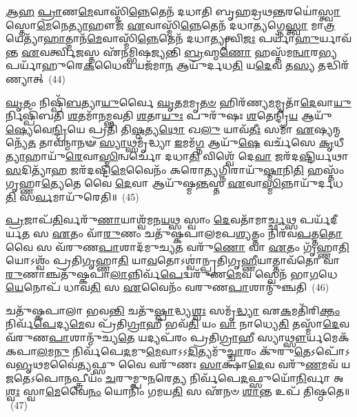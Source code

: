 \-\ul{𑌆}\-\-\ul{𑌹} \ul{𑌪𑍍𑌰𑌾}\-𑌣\-\ul{𑌮𑍇}\-𑌵𑌾𑌸𑍍𑌮𑌿᳴\-\ul{𑌨𑍍𑌨𑍇}\-𑌤𑍇𑌨᳴ 𑌦𑌧𑌾𑌤𑌿 𑌬𑍃𑌹𑌦𑍍𑌰𑌥\-\ul{𑌨𑍍𑌤}\-𑌰𑌯𑍋॑\-\ul{𑌸𑍍𑌤𑍍𑌵𑌾} 𑌸𑍍𑌤𑍋\-\ul{𑌮𑍇}\-𑌨𑍇\-\ul{𑌤𑍍𑌯𑌾}\-𑌹𑍗𑌜᳴ \ul{𑌏}\-𑌵𑌾𑌸𑍍𑌮𑌿᳴\-\ul{𑌨𑍍𑌨𑍇}\-𑌤𑍇𑌨᳴ 𑌦𑌧𑌾\-\ul{𑌤𑍍𑌯}\-𑌗𑍍𑌨𑍇\-\ul{𑌸𑍍𑌤𑍍𑌵𑌾} 𑌮𑌾\-\ul{𑌤𑍍𑌰}\-𑌯𑍇𑌤𑍍𑌯𑌾᳴\-\ul{𑌹𑌾}\-𑌤𑍍𑌮𑌾𑌨᳴\-\ul{𑌮𑍇}\-𑌵𑌾𑌸𑍍𑌮𑌿᳴\-\ul{𑌨𑍍𑌨𑍇}\-𑌤𑍇𑌨᳴ 𑌦𑌧𑌾\-\ul{𑌤𑍍𑌯𑍃}\-𑌤𑍍𑌵𑌿\-\ul{𑌜𑌃} 𑌪𑌰𑍍𑌯𑌾᳴\-\ul{𑌹𑍁}\-𑌰𑍍𑌯𑌾𑌵᳴𑌨𑍍𑌤 \ul{𑌏}\-𑌵𑌰𑍍𑌤𑍍𑌵𑌿\-\ul{𑌜}\-𑌸𑍍𑌤 𑌏᳴𑌨𑌮𑍍𑌭𑌿𑌷𑌜𑍍𑌯𑌨𑍍𑌤𑌿 \ul{𑌬𑍍𑌰}\-𑌹𑍍𑌮\-\ul{𑌣𑍋} 𑌹𑌸𑍍𑌤᳴𑌮\-\ul{𑌨𑍍𑌵𑌾}\-𑌰\-\ul{𑌭𑍍𑌯} 𑌪𑌰𑍍𑌯𑌾᳴𑌹𑍁𑌰𑍇\-\ul{𑌕}\-𑌧𑍈𑌵 𑌯𑌜᳴𑌮𑌾\-\ul{𑌨} 𑌆𑌯𑍁᳴𑌰𑍍𑌦𑌧\-\ul{𑌤𑌿} 𑌯\-\ul{𑌦𑍇}\-𑌵 𑌤\-\ul{𑌸𑍍𑌯} 𑌤𑌦𑍍𑌧𑌿𑌰᳴𑌣𑍍𑌯𑌾𑌤𑍍~(44)

\-\ul{𑌘𑍃}\-𑌤𑌂 𑌨𑌿𑌷𑍍𑌪𑌿᳴\-\ul{𑌬}\-𑌤𑍍𑌯𑌾\-\ul{𑌯𑍁}\-𑌰𑍍𑌵𑍈 \ul{𑌘𑍃}\-𑌤\-\ul{𑌮}\-𑌮𑍃\-\ul{𑌤}\-\-\ul{𑍞} 𑌹𑌿𑌰᳴𑌣𑍍𑌯\-\ul{𑌮}\-𑌮𑍃𑌤𑌾᳴\-\ul{𑌦𑍇}\-𑌵𑌾\-\ul{𑌯𑍁}\-𑌰𑍍𑌨𑌿𑌷𑍍𑌪𑌿᳴𑌬𑌤𑌿 \ul{𑌶}\-𑌤𑌮𑌾᳴𑌨𑌮𑍍𑌭𑌵𑌤𑌿 \ul{𑌶}\-𑌤𑌾\-\ul{𑌯𑍁𑌃} 𑌪𑍁𑌰𑍁᳴𑌷𑌃 \ul{𑌶}\-𑌤𑍇𑌨𑍍𑌦𑍍𑌰𑌿᳴\-\ul{𑌯} 𑌆𑌯𑍁᳴\-\ul{𑌷𑍍𑌯𑍇}\-𑌵𑍇\-\ul{𑌨𑍍𑌦𑍍𑌰𑌿}\-𑌯𑍇 𑌪𑍍𑌰𑌤𑌿᳴ 𑌤𑌿\-\ul{𑌷𑍍𑌠}\-𑌤𑍍𑌯\-\ul{𑌥𑍋} 𑌖\-\ul{𑌲𑍁} 𑌯𑌾𑌵᳴\-\ul{𑌤𑍀𑌃} 𑌸𑌮𑌾᳴ \ul{𑌏}\-𑌷𑍍𑌯𑌨𑍍𑌮𑌨𑍍𑌯𑍇᳴\-\ul{𑌤} 𑌤𑌾𑌵᳴𑌨𑍍𑌮𑌾𑌨𑍟 \ul{𑌸𑍍𑌯𑌾}\-𑌥𑍍𑌸𑌮𑍃᳴𑌦𑍍𑌧𑍍𑌯𑌾 \ul{𑌇}\-𑌮𑌮᳴\-\ul{𑌗𑍍𑌨} 𑌆𑌯𑍁᳴\-\ul{𑌷𑍇} 𑌵𑌰𑍍𑌚᳴𑌸𑍇 \ul{𑌕𑍃}\-𑌧𑍀\-\ul{𑌤𑍍𑌯𑌾}\-𑌹𑌾𑌯𑍁᳴\-\ul{𑌰𑍇}\-𑌵𑌾\-\ul{𑌸𑍍𑌮𑌿}\-𑌨𑍍𑌵𑌰𑍍𑌚𑍋᳴ 𑌦𑌧𑌾\-\ul{𑌤𑌿} 𑌵𑌿𑌶𑍍𑌵𑍇᳴ 𑌦𑍇\-\ul{𑌵𑌾} 𑌜𑌰᳴𑌦\-\ul{𑌷𑍍𑌟𑌿}\-𑌰𑍍𑌯𑌥𑌾\-\ul{𑌸}\-𑌦𑌿𑌤𑍍𑌯𑌾᳴\-\ul{𑌹} 𑌜𑌰᳴𑌦𑌷𑍍𑌟𑌿\-\ul{𑌮𑍇}\-𑌵𑍈𑌨𑌂᳴ 𑌕𑌰𑍋\-\ul{𑌤𑍍𑌯}\-𑌗𑍍𑌨𑌿𑌰𑌾𑌯𑍁᳴\-\ul{𑌷𑍍𑌮𑌾}\-𑌨𑌿\-\ul{𑌤𑌿} 𑌹𑌸𑍍𑌤𑌂᳴ 𑌗𑍃𑌹𑍍𑌣𑌾\-\ul{𑌤𑍍𑌯𑍇}\-𑌤𑍇 𑌵𑍈 \ul{𑌦𑍇}\-𑌵𑌾 𑌆𑌯𑍁᳴𑌷𑍍𑌮\-\ul{𑌨𑍍𑌤}\-𑌸𑍍𑌤 \ul{𑌏}\-𑌵𑌾\-\ul{𑌸𑍍𑌮𑌿}\-𑌨𑍍𑌨𑌾𑌯𑍁᳴𑌰𑍍𑌦𑌧\-\ul{𑌤𑌿} 𑌸\-\ul{𑌰𑍍𑌵}\-𑌮𑌾𑌯𑍁᳴𑌰𑍇𑌤𑌿॥~(45)

{\anuvakamend[{𑌰𑌸𑌂᳴ \ul{𑌦𑍇}\-𑌵𑌾\-\ul{𑌨𑌾}\-\-\ul{𑍟} 𑌸𑍍𑌤𑍋\-\ul{𑌮𑍇}\-𑌨𑍇\-\ul{𑌤𑌿} 𑌹𑌿𑌰᳴\-\ul{𑌣𑍍𑌯𑌾}\-𑌦\-\ul{𑌸}\-𑌦𑌿\-\ul{𑌤𑌿} 𑌦𑍍𑌵𑌾𑌵𑌿𑍞᳴𑌶𑌤𑌿𑌶𑍍𑌚}]}%

\-\ul{𑌪𑍍𑌰}\-𑌜𑌾𑌪᳴\-\ul{𑌤𑌿}\-𑌰𑍍𑌵𑌰𑍁᳴\-\ul{𑌣𑌾}\-𑌯𑌾𑌶𑍍𑌵᳴𑌮𑌨\-\ul{𑌯}\-𑌥𑍍𑌸 𑌸𑍍𑌵𑌾𑌂 \ul{𑌦𑍇}\-𑌵𑌤𑌾᳴𑌮𑌾\-\ul{𑌰𑍍𑌚𑍍𑌛}\-𑌥𑍍𑌸 𑌪𑌰𑍍𑌯᳴𑌦𑍀𑌰𑍍𑌯\-\ul{𑌤} 𑌸 \ul{𑌏}\-𑌤𑌂 𑌵𑌾᳴\-\ul{𑌰𑍁}\-𑌣𑌂 𑌚𑌤𑍁᳴𑌷𑍍𑌕𑌪𑌾𑌲𑌮𑌪\-\ul{𑌶𑍍𑌯}\-𑌤𑍍𑌤𑌂 𑌨𑌿𑌰᳴𑌵\-\ul{𑌪}\-𑌤𑍍𑌤\-\ul{𑌤𑍋} 𑌵𑍈 𑌸 𑌵᳴𑌰𑍁𑌣\-\ul{𑌪𑌾}\-𑌶𑌾𑌦᳴𑌮𑍁𑌚𑍍𑌯\-\ul{𑌤} 𑌵𑌰𑍁᳴\-\ul{𑌣𑍋} 𑌵𑌾 \ul{𑌏}\-𑌤𑌂 𑌗𑍃᳴𑌹𑍍𑌣𑌾\-\ul{𑌤𑌿} 𑌯𑍋\-𑌽𑌶𑍍𑌵𑌂᳴ 𑌪𑍍𑌰𑌤𑌿\-\ul{𑌗𑍃}\-𑌹𑍍𑌣𑌾\-\ul{𑌤𑌿} 𑌯𑌾\-\ul{𑌵}\-𑌤𑍋\-𑌽𑌶𑍍𑌵𑌾॑𑌨𑍍𑌪𑍍𑌰𑌤𑌿𑌗𑍃\-\ul{𑌹𑍍𑌣𑍀}\-𑌯𑌾𑌤𑍍𑌤𑌾𑌵᳴𑌤𑍋 𑌵𑌾\-\ul{𑌰𑍁}\-𑌣𑌾𑌞𑍍𑌚𑌤𑍁᳴𑌷𑍍𑌕𑌪𑌾\-\ul{𑌲𑌾}\-𑌨𑍍𑌨𑌿𑌰𑍍𑌵᳴\-\ul{𑌪𑍇}\-𑌦𑍍𑌵𑌰𑍁᳴𑌣\-\ul{𑌮𑍇}\-𑌵 𑌸𑍍𑌵𑍇𑌨᳴ 𑌭𑌾\-\ul{𑌗}\-𑌧𑍇\-\ul{𑌯𑍇}\-𑌨𑍋𑌪᳴ 𑌧𑌾𑌵\-\ul{𑌤𑌿} 𑌸 \ul{𑌏}\-𑌵𑍈𑌨𑌂᳴ 𑌵𑌰𑍁𑌣\-\ul{𑌪𑌾}\-𑌶𑌾𑌨𑍍𑌮𑍁᳴𑌞𑍍𑌚𑌤𑌿~(46)

𑌚𑌤𑍁᳴𑌷𑍍𑌕𑌪𑌾𑌲𑌾 𑌭𑌵\-\ul{𑌨𑍍𑌤𑌿} 𑌚𑌤𑍁᳴\-\ul{𑌷𑍍𑌪𑌾}\-𑌦𑍍𑌧𑍍𑌯\-\ul{𑌶𑍍𑌵𑌃} 𑌸𑌮𑍃᳴\-\ul{𑌦𑍍𑌧𑍍𑌯𑌾} 𑌏\-\ul{𑌕}\-𑌮𑌤𑌿᳴𑌰𑌿\-\ul{𑌕𑍍𑌤𑌂} 𑌨𑌿𑌰𑍍𑌵᳴\-\ul{𑌪𑍇}\-𑌦𑍍𑌯\-\ul{𑌮𑍇}\-𑌵 𑌪𑍍𑌰᳴𑌤𑌿\-\ul{𑌗𑍍𑌰𑌾}\-𑌹𑍀 𑌭𑌵᳴\-\ul{𑌤𑌿} 𑌯𑌂 \ul{𑌵𑌾} 𑌨𑌾𑌧𑍍𑌯𑍇\-\ul{𑌤𑌿} 𑌤𑌸𑍍𑌮𑌾᳴\-\ul{𑌦𑍇}\-𑌵 𑌵᳴𑌰𑍁𑌣\-\ul{𑌪𑌾}\-𑌶𑌾𑌨𑍍𑌮𑍁᳴𑌚𑍍𑌯\-\ul{𑌤𑍇} 𑌯𑌦𑍍𑌯𑌪᳴𑌰𑌂 𑌪𑍍𑌰𑌤𑌿\-\ul{𑌗𑍍𑌰𑌾}\-𑌹𑍀 𑌸𑍍𑌯𑌾\-\ul{𑌥𑍍𑌸𑍗}\-𑌰𑍍𑌯𑌮𑍇𑌕᳴𑌕𑌪𑌾\-\ul{𑌲}\-𑌮\-\ul{𑌨𑍁} 𑌨𑌿𑌰𑍍𑌵᳴𑌪𑍇\-\ul{𑌦}\-𑌮𑍁\-\ul{𑌮𑍇}\-𑌵𑌾𑌽𑌽\-\ul{𑌦𑌿}\-𑌤𑍍𑌯𑌮𑍁᳴\-\ul{𑌚𑍍𑌚𑌾}\-𑌰𑌂 𑌕𑍁᳴𑌰𑍁\-\ul{𑌤𑍇}\-\-𑌽𑌪𑍋᳴\-𑌽𑌵\-\ul{𑌭𑍃}\-𑌥𑌮𑌵𑍈॑\-\ul{𑌤𑍍𑌯}\-𑌫𑍍𑌸𑍁 𑌵𑍈 𑌵𑌰𑍁᳴𑌣𑌃 \ul{𑌸𑌾}\-𑌕𑍍𑌷𑌾\-\ul{𑌦𑍇}\-𑌵 𑌵𑌰𑍁᳴\-\ul{𑌣}\-𑌮𑌵᳴ 𑌯𑌜𑌤𑍇\-𑌽𑌪𑍋\-\ul{𑌨}\-𑌪𑍍𑌤𑍍𑌰𑍀𑌯𑌂᳴ \ul{𑌚}\-𑌰𑍁𑌮𑍍𑌪𑍁\-\ul{𑌨}\-𑌰𑍇\-\ul{𑌤𑍍𑌯} 𑌨𑌿𑌰𑍍𑌵᳴𑌪𑍇\-\ul{𑌦}\-𑌫𑍍𑌸𑍁𑌯𑍋᳴\-\ul{𑌨𑌿}\-𑌰𑍍𑌵𑌾 𑌅\-\ul{𑌶𑍍𑌵𑌃} 𑌸𑍍𑌵𑌾\-\ul{𑌮𑍇}\-𑌵𑍈\-\ul{𑌨𑌂} 𑌯𑍋𑌨𑌿𑌂᳴ 𑌗𑌮𑌯\-\ul{𑌤𑌿} 𑌸 𑌏᳴𑌨𑍞 \ul{𑌶𑌾}\-𑌨𑍍𑌤 𑌉𑌪᳴ 𑌤𑌿𑌷𑍍𑌠𑌤𑍇॥~(47)

